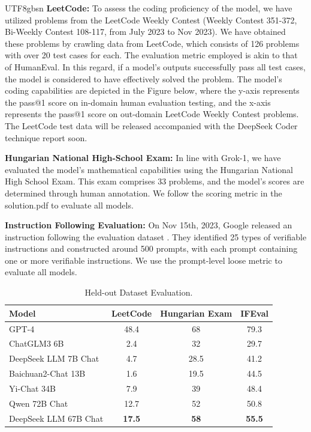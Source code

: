 \documentclass[11pt, a4paper, logo, copyright, nonumbering]{deepseek}
\begin{document}
\begin{CJK*}{UTF8}{gbsn}
\textbf{LeetCode: }To assess the coding proficiency of the model, we have utilized problems from the LeetCode Weekly Contest (Weekly Contest 351-372, Bi-Weekly Contest 108-117, from July 2023 to Nov 2023). We have obtained these problems by crawling data from LeetCode, which consists of 126 problems with over 20 test cases for each. The evaluation metric employed is akin to that of HumanEval. In this regard, if a model's outputs successfully pass all test cases, the model is considered to have effectively solved the problem. The model's coding capabilities are depicted in the Figure below, where the y-axis represents the pass@1 score on in-domain human evaluation testing, and the x-axis represents the pass@1 score on out-domain LeetCode Weekly Contest problems. The LeetCode test data will be released accompanied with the DeepSeek Coder technique report soon. 

\textbf{Hungarian National High-School Exam:} In line with Grok-1, we have evaluated the model's mathematical capabilities using the Hungarian National High School Exam. This exam comprises 33 problems, and the model's scores are determined through human annotation. We follow the scoring metric in the solution.pdf to evaluate all models.

\textbf{Instruction Following Evaluation: } On Nov 15th, 2023, Google released an instruction following the evaluation dataset \citep{IFeval}. They identified 25 types of verifiable instructions and constructed around 500 prompts, with each prompt containing one or more verifiable instructions. We use the prompt-level loose metric to evaluate all models. 



\begin{table}[h]
\centering \small
\begin{tabular}{lccc}
	\toprule
Model & LeetCode & Hungarian Exam & IFEval   \\ \midrule
GPT-4 & 48.4 & 68 & 79.3 \\ \midrule
ChatGLM3 6B & 2.4 & 32 & 29.7 \\ 
DeepSeek LLM 7B Chat & 4.7 & 28.5 & 41.2\\ 
Baichuan2-Chat 13B & 1.6& 19.5 &44.5 \\ 
Yi-Chat 34B & 7.9& 39& 48.4 \\ 
Qwen 72B Chat & 12.7 & 52 & 50.8 \\ 
DeepSeek LLM 67B Chat & \textbf{17.5} & \textbf{58} & \textbf{55.5}\\   
\bottomrule
\end{tabular}
\caption{\centering Held-out Dataset Evaluation.}
\label{table:heldout}
\end{table}


\end{CJK*}
\end{document}
